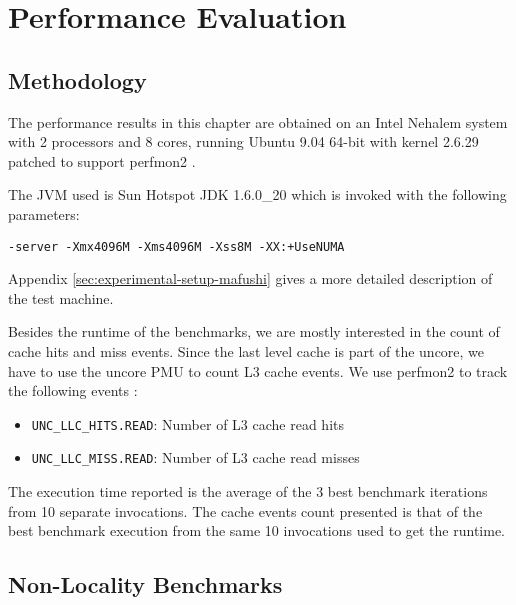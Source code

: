 
\chapter{Performance Evaluation}
\label{chap:locality-performance}

\section{Methodology}
\label{sec:locality-performance-methodology}

The performance results in this chapter are obtained on an Intel
Nehalem system with 2 processors and 8 cores, running Ubuntu 9.04
64-bit with kernel 2.6.29 patched to support perfmon2
\cite{Eranian2008}.

The JVM used is Sun Hotspot JDK 1.6.0\_20 which is invoked with the
following parameters:

\begin{lstlisting}[style=Listing]
  -server -Xmx4096M -Xms4096M -Xss8M -XX:+UseNUMA
\end{lstlisting}

Appendix \ref{sec:experimental-setup-mafushi} gives a more detailed
description of the test machine.

Besides the runtime of the benchmarks, we are mostly interested in the
count of cache hits and miss events. Since the last level cache is
part of the uncore, we have to use the uncore PMU to count L3 cache
events. We use perfmon2 to track the following events
\cite{Levinthal2009}:

\begin{itemize}
\item \lstinline!UNC_LLC_HITS.READ!: Number of L3 cache read hits
\item \lstinline!UNC_LLC_MISS.READ!: Number of L3 cache read misses
\end{itemize}

The execution time reported is the average of the 3 best benchmark
iterations from 10 separate invocations. The cache events count
presented is that of the best benchmark execution from the same 10
invocations used to get the runtime.


\section{Non-Locality Benchmarks}
\label{sec:locality-performance-non-locality}


